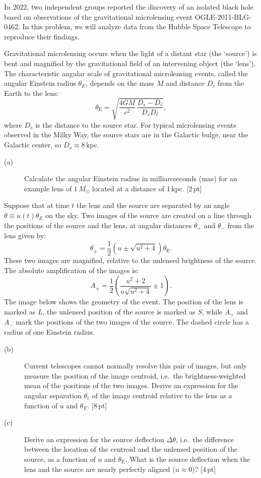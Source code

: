 In 2022, two independent groups reported the discovery of an isolated black
hole based on observations of the gravitational microlensing event
OGLE-2011-BLG-0462. In this problem, we will analyze data from the Hubble
Space Telescope to reproduce their findings.

Gravitational microlensing occurs when the light of a distant star (the
`source') is bent and magnified by the gravitational field of an intervening
object (the `lens'). The characteristic angular scale of gravitational
microlensing events, called the angular Einstein radius $\theta_E$, depends on
the mass $M$ and distance $D_\ell$ from the Earth to the lens:
\[ \theta_{\mathrm{E}} = \sqrt{\frac{4GM}{c^2}\,
   \frac{D_s - D_\ell}{D_s D_\ell}}, \]
where $D_s$ is the distance to the source star. For typical microlensing
events observed in the Milky Way, the source stars are in the Galactic bulge,
near the Galactic center, so $D_s \approx 8$\,kpc.

\begin{description}
\item[(a)] Calculate the angular Einstein radius in milliarcseconds (mas) for
  an example lens of $1\,M_\odot$ located at a distance of 1\,kpc.
  \hfill[2\,pt]
\end{description}

Suppose that at time $t$ the lens and the source are separated by an angle
$\theta \equiv u(t)\theta_E$ on the sky. Two images of the source are created
on a line through the positions of the source and the lens, at angular
distances $\theta_+$ and $\theta_-$ from the lens given by:
\[ \theta_\pm = \frac{1}{2}\left(u \pm \sqrt{u^2 + 4}\right)
   \theta_{\mathrm{E}}. \]
These two images are magnified, relative to the unlensed brightness of the
source. The absolute amplification of the images is:
\[ A_\pm = \frac{1}{2}\left(\frac{u^2 + 2}{u\sqrt{u^2 + 4}} \pm 1\right). \]
The image below shows the geometry of the event. The position of the lens is
marked as $L$, the unlensed position of the source is marked as $S$, while
$A_+$ and $A_-$ mark the positions of the two images of the source. The
dashed circle has a radius of one Einstein radius.


\begin{description}
\item[(b)] Current telescopes cannot normally resolve this pair of images, but
  only measure the position of the image centroid, i.e.\ the
  brightness-weighted mean of the positions of the two images. Derive an
  expression for the angular separation $\theta_c$ of the image centroid
  relative to the lens as a function of $u$ and $\theta_E$. \hfill[8\,pt]
\item[(c)] Derive an expression for the source deflection $\Delta\theta$,
  i.e.\ the difference between the location of the centroid and the unlensed
  position of the source, as a function of $u$ and $\theta_{\mathrm{E}}$. What
  is the source deflection when the lens and the source are nearly perfectly
  aligned ($u \approx 0$)? \hfill[4\,pt]
\end{description}

